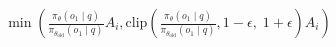 \documentclass[preview]{standalone}
\begin{document}
\begin{align*}
\min \left(\frac{\pi_\theta(o_1 \mid q)}{\pi_{\theta_{\text{old}}}(o_1 \mid q)} A_i, \text{clip} \left( \frac{\pi_\theta(o_1 \mid q)}{\pi_{\theta_{\text{old}}}(o_1 \mid q)}, 1 - \epsilon,\; 1 + \epsilon \right) A_i \right)
\end{align*}
\end{document}
